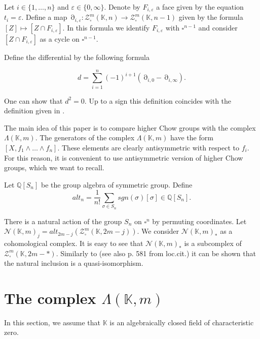 \documentclass[12pt]{extarticle}
\def\mb{\mathbb}
\def\mc{\mathcal}
\def\L{\Lambda}
\def\k{\mb K}
\def\Z{\mb Z}
\def\Q{\mb Q}
\def\N{\mc N}
\def \CH{\mc{N}}
\DeclareMathOperator{\ts}{\partial}
\begin{document}
Let $i\in\{1,\dots, n\}$ and $\varepsilon\in \{0,\infty\}$. Denote by $F_{i,\varepsilon}$ a face given by the equation $t_i=\varepsilon$. Define a map $\ts_{i,\varepsilon}\colon \mc Z_\square^m(\k,n)\to \mc Z_\square^m(\k,n-1)$ given by the formula $[Z]\mapsto [Z\cap F_{i,\varepsilon}].$ In this formula we identify $F_{i,\varepsilon}$ with $\square^{n-1}$ and consider $[Z\cap F_{i,\varepsilon}]$ as a cycle on $\square^{n-1}$.

Define the differential by the following formula

$$d=\sum\limits_{i=1}^n(-1)^{i+1}(\ts_{i,0}-\ts_{i,\infty}).$$

One can show that $d^2=0$. Up to a sign this definition coincides with the definition given in \cite{bloch_rriz_1994_mixed}.

The main idea of this paper is to compare higher Chow groups with the complex $\L(\k,m)$. The generators of the complex $\L(\k,m)$ have the form $[X,f_1\wedge\dots\wedge f_n]$. These elements are clearly antisymmetric with respect to $f_i$. For this reason, it is convenient to use antisymmetric version of higher Chow groups, which we want to recall.

Let $\mb Q[S_n]$ be the group algebra of symmetric group. Define 
$$alt_{n}=\dfrac 1{n!}\sum\limits_{\sigma\in S_n}sgn(\sigma)[\sigma]\in\Q[S_n].$$




There is a natural action of the group $S_{n}$ on $\square^n$ by permuting coordinates.  Let $\N(\k,m)_j=alt_{2m-j}(\mc Z^m_\square(\k,2m-j))$. We consider $\N(\k,m)_*$ as a cohomological complex. It is easy to see that $\CH(\k,m)_*$ is a subcomplex of $\mc Z_\square^m(\k, 2m-*)$. Similarly to \cite[Proposition 5.1.]{bloch_rriz_1994_mixed}(see also p. 581 from loc.cit.) it can be shown that the natural inclusion is a quasi-isomorphism.



\section{The complex $\L(\k,m)$}
\label{sec:Lambda_properties}
In this section, we assume that $\k$ is an algebraically closed field of characteristic zero.
\end{document}

